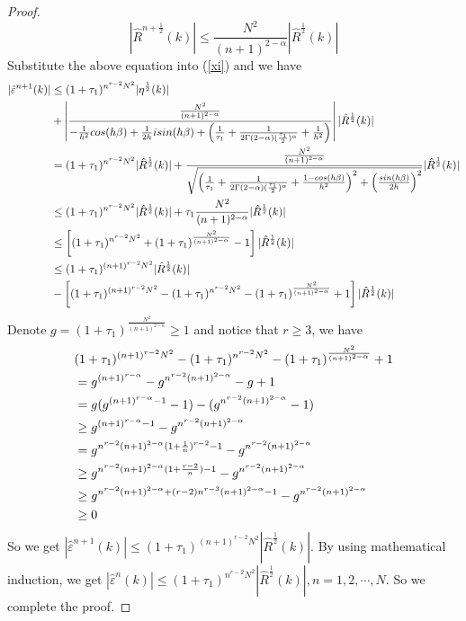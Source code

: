 \documentclass[10pt,a4paper]{amsart}
\begin{document}
\begin{proof}
$$
\left|\hat{R}^{n+\frac{1}{2}}(k)\right|\leq \frac{N^2}{(n+1)^{2-\alpha}}\left|\hat{R}^{\frac{1}{2}}(k)\right|
$$
Substitute the above equation into (\ref{xi}) and we have
\begin{align}
    |\hat{\varepsilon}^{n+1}(k)|&\leq (1+\tau_1)^{n^{r-2}N^{2}}|\eta^{\frac{1}{2}}(k)|\notag\\
    &+\left|\frac{\frac{N^2}{(n+1)^{2-\alpha}}}{-\frac{1}{h^2}cos(h\beta)+\frac{1}{2h}isin(h\beta)+\left(\frac{1}{\tau_{1}}+\frac{1}{2\Gamma(2-\alpha)(\frac{\tau_{1}}{2})^\alpha}+\frac{1}{h^2}\right)}\right||\hat{R}^{\frac{1}{2}}(k)|\notag\\
    &=(1+\tau_1)^{n^{r-2}N^{2}}|\hat{R}^{\frac{1}{2}}(k)|+\frac{\frac{N^2}{(n+1)^{2-\alpha}}}{\sqrt{\left( \frac{1}{\tau_1}+\frac{1}{2\Gamma(2-\alpha)(\frac{\tau_{1}}{2})^\alpha}+\frac{1-cos(h\beta)}{h^2}\right)^2+\left(\frac{sin(h\beta)}{2h}\right)^2}}|\hat{R}^{\frac{1}{2}}(k)|\notag\\
    &\leq (1+\tau_1)^{n^{r-2}N^{2}}|\hat{R}^{\frac{1}{2}}(k)|+\tau_1 \frac{N^2}{(n+1)^{2-\alpha}}|\hat{R}^{\frac{1}{2}}(k)|\notag\\
    &\leq \left[(1+\tau_1)^{n^{r-2}N^{2}}+(1+\tau_1)^{\frac{N^2}{(n+1)^{2-\alpha}}}-1\right]|\hat{R}^{\frac{1}{2}}(k)|\notag\\
    &\leq(1+\tau_1)^{(n+1)^{r-2}N^{2}}|\hat{R}^{\frac{1}{2}}(k)|\notag\\
    &- \left[(1+\tau_1)^{(n+1)^{r-2}N^{2}}-(1+\tau_1)^{n^{r-2}N^{2}}-(1+\tau_1)^{\frac{N^2}{(n+1)^{2-\alpha}}}+1\right]|\hat{R}^{\frac{1}{2}}(k)|\notag
\end{align}
Denote $g = (1+\tau_1)^{\frac{N^2}{(n+1)^{2-\alpha}}}\geq 1$ and notice that $r\geq 3$,  we have
\begin{align}
    &(1+\tau_1)^{(n+1)^{r-2}N^{2}}-(1+\tau_1)^{n^{r-2}N^{2}}-(1+\tau_1)^{\frac{N^2}{(n+1)^{2-\alpha}}}+1\notag\\
    &= g^{(n+1)^{r-\alpha}}-g^{n^{r-2}(n+1)^{2-\alpha}}-g+1\notag\\
    &=g(g^{(n+1)^{r-\alpha}-1}-1)-(g^{n^{r-2}(n+1)^{2-\alpha}}-1)\notag\\
    &\geq g^{(n+1)^{r-\alpha}-1}-g^{n^{r-2}(n+1)^{2-\alpha}}\notag\\
    &= g^{n^{r-2}(n+1)^{2-\alpha}(1+\frac{1}{n})^{r-2}-1}-g^{n^{r-2}(n+1)^{2-\alpha}}\notag\\
    &\geq g^{n^{r-2}(n+1)^{2-\alpha}(1+\frac{r-2}{n})-1}-g^{n^{r-2}(n+1)^{2-\alpha}}\notag\\
    &\geq g^{n^{r-2}(n+1)^{2-\alpha}+(r-2)n^{r-3}(n+1)^{2-\alpha}-1}-g^{n^{r-2}(n+1)^{2-\alpha}}\notag\\
    &\geq 0 \notag
\end{align}
So we get $|\hat{\varepsilon}^{n+1}(k)|\leq (1+\tau_1)^{(n+1)^{r-2}N^{2}}\left|\hat{R}^{\frac{1}{2}}(k)\right|$. By using mathematical induction,  we get $|\hat{\varepsilon}^n(k)|\leq (1+\tau_1)^{n^{r-2}N^{2}}|\hat{R}^{\frac{1}{2}}(k)|, n=1, 2, \cdots, N$. So we complete the proof. 
\end{proof}
\end{document}
